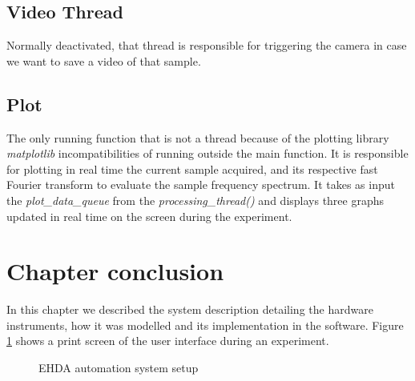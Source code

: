    \subsection{Video Thread}

        Normally deactivated, that thread is responsible for triggering the camera in case we want to save a video of that sample.
    
    \subsection{Plot}

        The only running function that is not a thread because of the plotting library \emph{matplotlib} incompatibilities of running outside the main function. 
        It is responsible for plotting in real time the current sample acquired, and its respective fast Fourier transform to evaluate the sample frequency spectrum.
        It takes as input the \emph{plot\_data\_queue} from the \emph{processing\_thread()} and displays three graphs updated in real time on the screen during the experiment.

  \section{Chapter conclusion}

    In this chapter we described the system description detailing the hardware instruments, how it was modelled and its implementation in the software. Figure \ref{fig:Methodology_example1} shows a print screen of the user interface during an experiment.

    \begin{figure}[H]
      \centering
      \caption{EHDA automation system setup}
      \label{fig:Methodology_example1}
  \end{figure}
\clearpage
